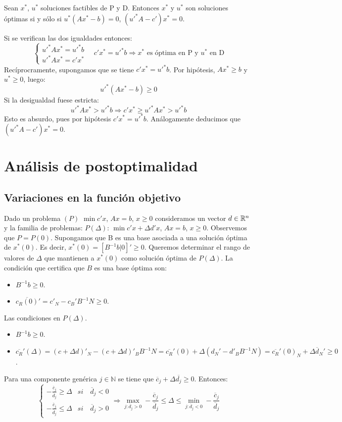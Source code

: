 \documentclass[PM.tex]{subfiles}
\begin{document}
\begin{theorem} Sean $x^*$, $u^*$ soluciones factibles de P y D. Entonces $x^*$ y $u^*$ son soluciones óptimas si y sólo si $u^*(Ax^*-b)=0$, $(u'^{*} A-c')x^*=0$.
\end{theorem}
\begin{dem} Si se verifican las dos igualdades entonces:
\[
\begin{cases}
u'^* A x^* = u'^*b \\
u'^*A x^* = c'x^* 
\end{cases}
\quad c'x^* = u'^*b \Rightarrow \text{$x^*$ es óptima en P y $u^*$ en D}
\]
Recíprocramente, supongamos que se tiene $c'x^*=u'^*b$. Por hipótesis, $Ax^*\geq b$ y $u^* \geq 0$, luego:
\[
u'^*(Ax^*-b)\geq 0
\]
Si la desigualdad fuese estricta:
\[
u'^*Ax^* > u'^* b \Rightarrow c'x^* \geq u'^*Ax^*>u'^*b
\]
Esto es absurdo, pues por hipótesis $c'x^*=u'^*b$. Análogamente deducimos que $(u'^*A-c')x^* = 0$.
\end{dem}
\section{Análisis de postoptimalidad}
\subsection{Variaciones en la función objetivo}
Dado un problema $(P)$ $\min c'x$, $Ax=b$, $x\geq 0$ consideramos un vector $d\in\mathbb{R}^n$ y la familia de problemas: $P(\Delta)$: $\min c'x + \Delta d'x$, $Ax=b$, $x\geq 0$. Observemos que $P=P(0)$. Supongamos que B es una base asociada a una solución óptima de $x^*(0)$. Es decir, $x^*(0)=[B^{-1}b | 0]' \geq 0$. Queremos determinar el rango de valores de $\Delta$ que mantienen a $x^*(0)$ como solución óptima de $P(\Delta)$. La condición que certifica que $B$ es una base óptima son:
\begin{itemize}
\item $B^{-1}b \geq 0$.
\item $\overline{c_R(0)}'  = c'_N - c_B'B^{-1}N \geq 0$. 
\end{itemize}
Las condiciones en $P(\Delta)$. 
\begin{itemize}
\item $B^{-1}b \geq 0$.
\item $\overline{c_R}'(\Delta) = (c +\Delta d)'_N- (c+\Delta d)'_B B^{-1}N = \overline{c_R}'(0)  + \Delta (d_N'-d'_BB^{-1}N) =  \overline{c_R}'(0)_N + \Delta \overline{d}_N'\geq 0$. 
\end{itemize}
Para una componente genérica $j\in \mathbb{N}$ se tiene que $\overline{c}_j+\Delta \overline{d_j}\geq 0$. Entonces:
\[
\begin{cases}
-\frac{\overline{c}_j}{\overline{d}_j} \geq \Delta & si \quad \overline{d}_j <0\\
-\frac{\overline{c}_j}{\overline{d}_j} \leq \Delta & si \quad \overline{d}_j >0
\end{cases}
\Rightarrow \max_{j:\overline{d}_j >0}-\frac{\overline{c}_j}{\overline{d}_j} \leq \Delta \leq \min_{j:\overline{d}_j <0}-\frac{\overline{c}_j}{\overline{d}_j}
\]
\end{document}
